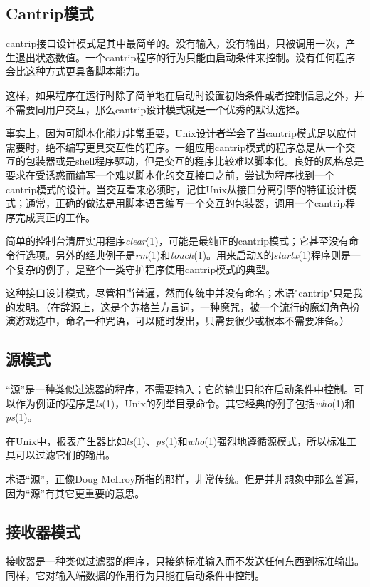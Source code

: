 \documentclass[12pt,oneside]{book}
\begin{document}
\subsection{Cantrip模式}
cantrip接口设计模式是其中最简单的。没有输入，没有输出，只被调用一次，产生退出状态数值。一个cantrip程序的行为只能由启动条件来控制。没有任何程序会比这种方式更具备脚本能力。

这样，如果程序在运行时除了简单地在启动时设置初始条件或者控制信息之外，并不需要同用户交互，那么cantrip设计模式就是一个优秀的默认选择。

事实上，因为可脚本化能力非常重要，Unix设计者学会了当cantrip模式足以应付需要时，绝不编写更具交互性的程序。一组应用cantrip模式的程序总是从一个交互的包装器或是shell程序驱动，但是交互的程序比较难以脚本化。良好的风格总是要求在受诱惑而编写一个难以脚本化的交互接口之前，尝试为程序找到一个cantrip模式的设计。当交互看来必须时，记住Unix从接口分离引擎的特征设计模式；通常，正确的做法是用脚本语言编写一个交互的包装器，调用一个cantrip程序完成真正的工作。

简单的控制台清屏实用程序\textit{clear}(1)，可能是最纯正的cantrip模式；它甚至没有命令行选项。另外的经典例子是\textit{rm}(1)和\textit{touch}(1)。用来启动X的\textit{startx}(1)程序则是一个复杂的例子，是整个一类守护程序使用cantrip模式的典型。

这种接口设计模式，尽管相当普遍，然而传统中并没有命名；术语"cantrip"只是我的发明。（在辞源上，这是个苏格兰方言词，一种魔咒，被一个流行的魔幻角色扮演游戏选中，命名一种咒语，可以随时发出，只需要很少或根本不需要准备。）

\subsection{源模式}
“源”是一种类似过滤器的程序，不需要输入；它的输出只能在启动条件中控制。可以作为例证的程序是\textit{ls}(1)，Unix的列举目录命令。其它经典的例子包括\textit{who}(1)和\textit{ps}(1)。

在Unix中，报表产生器比如\textit{ls}(1)、\textit{ps}(1)和\textit{who}(1)强烈地遵循源模式，所以标准工具可以过滤它们的输出。

术语“源”，正像Doug McIlroy所指的那样，非常传统。但是并非想象中那么普遍，因为“源”有其它更重要的意思。


\subsection{接收器模式}
接收器是一种类似过滤器的程序，只接纳标准输入而不发送任何东西到标准输出。同样，它对输入端数据的作用行为只能在启动条件中控制。
\end{document}
